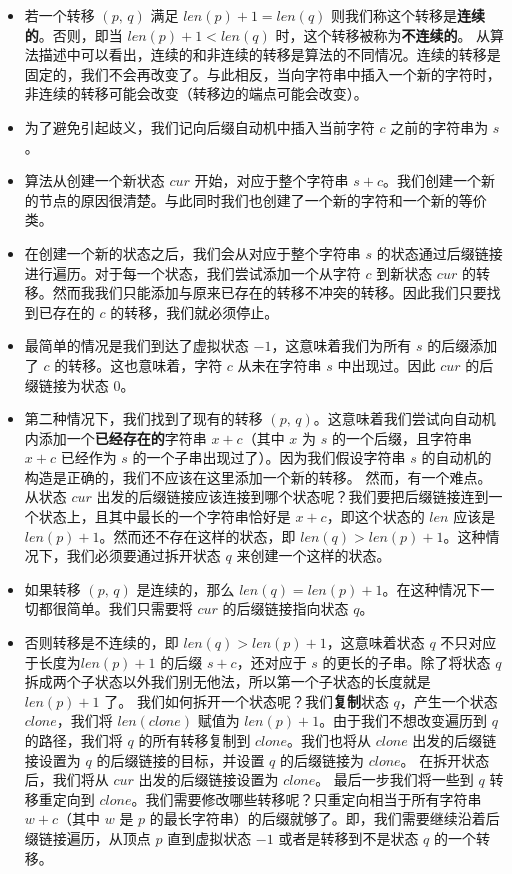 \begin{itemize}
\item 若一个转移 $(p,\,q)$ 满足 $len(p)+1=len(q)$ 则我们称这个转移是\textbf{连续的}。否则，即当 $len(p)+1<len(q)$ 时，这个转移被称为\textbf{不连续的}。  从算法描述中可以看出，连续的和非连续的转移是算法的不同情况。连续的转移是固定的，我们不会再改变了。与此相反，当向字符串中插入一个新的字符时，非连续的转移可能会改变（转移边的端点可能会改变）。
\item 为了避免引起歧义，我们记向后缀自动机中插入当前字符 $c$ 之前的字符串为 $s$。
\item 算法从创建一个新状态 $cur$ 开始，对应于整个字符串 $s+c$。我们创建一个新的节点的原因很清楚。与此同时我们也创建了一个新的字符和一个新的等价类。
\item 在创建一个新的状态之后，我们会从对应于整个字符串 $s$ 的状态通过后缀链接进行遍历。对于每一个状态，我们尝试添加一个从字符 $c$ 到新状态 $cur$ 的转移。然而我我们只能添加与原来已存在的转移不冲突的转移。因此我们只要找到已存在的 $c$ 的转移，我们就必须停止。
\item 最简单的情况是我们到达了虚拟状态 $-1$，这意味着我们为所有 $s$ 的后缀添加了 $c$ 的转移。这也意味着，字符 $c$ 从未在字符串 $s$ 中出现过。因此 $cur$ 的后缀链接为状态 $0$。
\item 第二种情况下，我们找到了现有的转移 $(p,\,q)$。这意味着我们尝试向自动机内添加一个\textbf{已经存在的}字符串 $x+c$（其中 $x$ 为 $s$ 的一个后缀，且字符串 $x+c$ 已经作为 $s$ 的一个子串出现过了）。因为我们假设字符串 $s$ 的自动机的构造是正确的，我们不应该在这里添加一个新的转移。  然而，有一个难点。从状态 $cur$ 出发的后缀链接应该连接到哪个状态呢？我们要把后缀链接连到一个状态上，且其中最长的一个字符串恰好是 $x+c$，即这个状态的 $len$ 应该是 $len(p)+1$。然而还不存在这样的状态，即 $len(q)>len(p)+1$。这种情况下，我们必须要通过拆开状态 $q$ 来创建一个这样的状态。
\item 如果转移 $(p,\,q)$ 是连续的，那么 $len(q)=len(p)+1$。在这种情况下一切都很简单。我们只需要将 $cur$ 的后缀链接指向状态 $q$。
\item 否则转移是不连续的，即 $len(q)>len(p)+1$，这意味着状态 $q$ 不只对应于长度为$len(p)+1$ 的后缀 $s+c$，还对应于 $s$ 的更长的子串。除了将状态 $q$ 拆成两个子状态以外我们别无他法，所以第一个子状态的长度就是 $len(p)+1$ 了。  
我们如何拆开一个状态呢？我们\textbf{复制}状态 $q$，产生一个状态 $clone$，我们将 $len(clone)$ 赋值为 $len(p)+1$。由于我们不想改变遍历到 $q$ 的路径，我们将 $q$ 的所有转移复制到 $clone$。我们也将从 $clone$ 出发的后缀链接设置为 $q$ 的后缀链接的目标，并设置 $q$ 的后缀链接为 $clone$。  
在拆开状态后，我们将从 $cur$ 出发的后缀链接设置为 $clone$。  
最后一步我们将一些到 $q$ 转移重定向到 $clone$。我们需要修改哪些转移呢？只重定向相当于所有字符串 $w+c$（其中 $w$ 是 $p$ 的最长字符串）的后缀就够了。即，我们需要继续沿着后缀链接遍历，从顶点 $p$ 直到虚拟状态 $-1$ 或者是转移到不是状态 $q$ 的一个转移。
\end{itemize}

